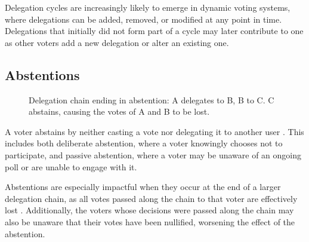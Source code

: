Delegation cycles are increasingly likely to emerge in dynamic voting systems, where delegations can be added, removed, or modified at any point in time. Delegations that initially did not form part of a cycle may later contribute to one as other voters add a new delegation or alter an existing one.
\subsection*{Abstentions}
\begin{figure}[H]
    \centering
    \caption{Delegation chain ending in abstention: A delegates to B, B to C. C abstains, causing the votes of A and B to be lost.}
    \label{fig:delegation-abstention}
\end{figure}

A voter abstains by neither casting a vote nor delegating it to another user \citep{brill_liquid_2022}. This includes both deliberate abstention, where a voter knowingly chooses not to participate, and passive abstention, where a voter may be unaware of an ongoing poll or are unable to engage with it.

Abstentions are especially impactful when they occur at the end of a larger delegation chain, as all votes passed along the chain to that voter are effectively lost \citep{brill_liquid_2022}. Additionally, the voters whose decisions were passed along the chain may also be unaware that their votes have been nullified, worsening the effect of the abstention.

